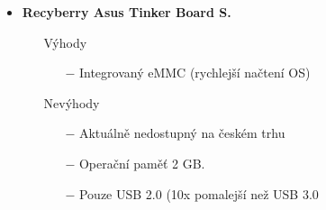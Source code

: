 \begin{itemize}
\begin{itemize}
        \end{itemize}
    \item \textbf{Recyberry Asus Tinker Board S.} 
        \begin{itemize}
            \item[] Výhody
            \begin{itemize}
                \item[$-$] Integrovaný eMMC (rychlejší načtení OS)
            \end{itemize}
            \item[] Nevýhody
            \begin{itemize}
                \item[$-$] Aktuálně nedostupný na českém trhu%
                \item[$-$] Operační paměť 2 GB.
                \item[$-$] Pouze USB 2.0 (10x pomalejší než USB 3.0 %
            \end{itemize}
        \end{itemize}
\end{itemize}











%
%
%
%
